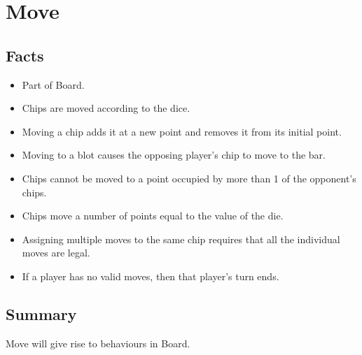 \section{Move}

\subsection{Facts}

\begin{itemize} [itemsep=2pt,parsep=2pt]
    \item Part of Board.
    \item Chips are moved according to the dice.
    \item Moving a chip adds it at a new point and removes it from its initial point.
    \item Moving to a blot causes the opposing player’s chip to move to the bar.
    \item Chips cannot be moved to a point occupied by more than 1 of the opponent's chips.
    \item Chips move a number of points equal to the value of the die.
    \item Assigning multiple moves to the same chip requires that all the individual moves are legal.
    \item If a player has no valid moves, then that player's turn ends.
\end{itemize}


\subsection{Summary}
Move will give rise to behaviours in Board.
